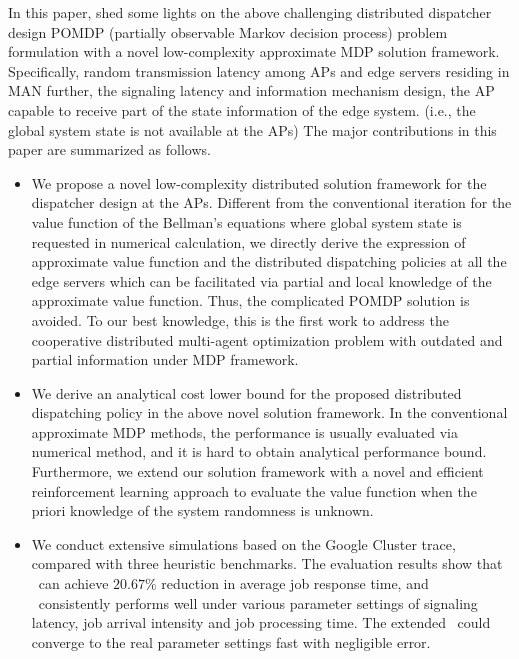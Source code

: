 In this paper, 
{
    shed some lights on the above challenging distributed dispatcher design
    POMDP (partially observable Markov decision process) problem formulation
    with a novel low-complexity approximate MDP solution framework.
}
Specifically,
{
    random transmission latency among APs and edge servers residing in MAN
    further, the signaling latency and information mechanism design, the AP capable to receive part of the state information of the edge system.
    (i.e., the global system state is not available at the APs)
}
The major contributions in this paper are summarized as follows.
\begin{itemize}
    \item We propose a novel low-complexity distributed solution framework for the dispatcher design at the APs.
    Different from the conventional iteration for the value function of the Bellman's equations where global system state is requested in numerical calculation,
    we directly derive the expression of approximate value function and the distributed dispatching policies at all the edge servers which can be facilitated via partial and local knowledge of the approximate value function.
    Thus, the complicated POMDP solution is avoided.
    To our best knowledge, this is the first work to address the cooperative distributed multi-agent optimization problem {with outdated and partial information} under MDP framework.
    \item We derive an analytical cost lower bound for the proposed distributed dispatching policy in the above novel solution framework. In the conventional approximate MDP methods, the performance is usually evaluated via numerical method, and it is hard to obtain analytical performance bound. Furthermore, we extend our solution framework with a novel and efficient reinforcement learning approach to evaluate the value function when the priori knowledge of the system randomness is unknown.
    \item We conduct extensive simulations based on the Google Cluster trace, compared with three heuristic benchmarks. The evaluation results show that \algname~can achieve $20.67\%$ reduction in average job response time, and \algname~consistently performs well under various parameter settings of signaling latency, job arrival intensity and job processing time. The extended \algname~could converge to the real parameter settings fast with negligible error.
\end{itemize}


